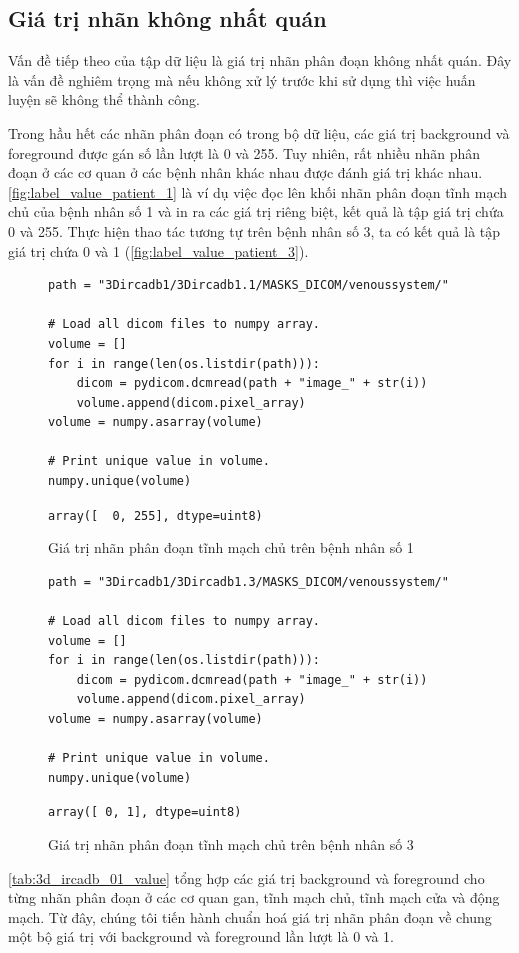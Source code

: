 \subsection{Giá trị nhãn không nhất quán}
\label{subsec:gia_tri_nhan_khong_nhat_quan}
	Vấn đề tiếp theo của tập dữ liệu là giá trị nhãn phân đoạn không nhất quán. Đây là vấn đề nghiêm trọng mà nếu không xử lý trước khi sử dụng thì việc huấn luyện sẽ không thể thành công. 
	
	Trong hầu hết các nhãn phân đoạn có trong bộ dữ liệu, các giá trị background và foreground được gán số lần lượt là 0 và 255. Tuy nhiên, rất nhiều nhãn phân đoạn ở các cơ quan ở các bệnh nhân khác nhau được đánh giá trị khác nhau. \autoref{fig:label_value_patient_1} là ví dụ việc đọc lên khối nhãn phân đoạn tĩnh mạch chủ của bệnh nhân số 1 và in ra các giá trị riêng biệt, kết quả là tập giá trị chứa 0 và 255. Thực hiện thao tác tương tự trên bệnh nhân số 3, ta có kết quả là tập giá trị chứa 0 và 1 (\autoref{fig:label_value_patient_3}).
	\begin{figure}[h!]
		\begin{lstlisting}
path = "3Dircadb1/3Dircadb1.1/MASKS_DICOM/venoussystem/"

# Load all dicom files to numpy array.
volume = []
for i in range(len(os.listdir(path))):
	dicom = pydicom.dcmread(path + "image_" + str(i))
	volume.append(dicom.pixel_array)
volume = numpy.asarray(volume)

# Print unique value in volume.
numpy.unique(volume)
		\end{lstlisting}
		\hspace{7mm}\verb/array([  0, 255], dtype=uint8)/
		\caption{Giá trị nhãn phân đoạn tĩnh mạch chủ trên bệnh nhân số 1}
		\label{fig:label_value_patient_1}
	\end{figure}

	
	\begin{figure}[h!]
		\begin{lstlisting}
path = "3Dircadb1/3Dircadb1.3/MASKS_DICOM/venoussystem/"

# Load all dicom files to numpy array.
volume = []
for i in range(len(os.listdir(path))):
	dicom = pydicom.dcmread(path + "image_" + str(i))
	volume.append(dicom.pixel_array)
volume = numpy.asarray(volume)

# Print unique value in volume.
numpy.unique(volume)
		\end{lstlisting}
		\hspace{7mm}\verb/array([ 0, 1], dtype=uint8)/
		\caption{Giá trị nhãn phân đoạn tĩnh mạch chủ trên bệnh nhân số 3}
		\label{fig:label_value_patient_3}
	\end{figure}
	\newpage
	\autoref{tab:3d_ircadb_01_value} tổng hợp các giá trị background và foreground cho từng nhãn phân đoạn ở các cơ quan gan, tĩnh mạch chủ, tĩnh mạch cửa và động mạch. Từ đây, chúng tôi tiến hành chuẩn hoá giá trị nhãn phân đoạn về chung một bộ giá trị với background và foreground lần lượt là 0 và 1.

